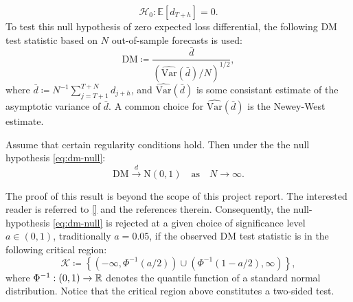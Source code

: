 \begin{equation}\label{eq:dm-null}
    \mathcal{H}_{0}:\mathbb{E}[d_{T+h}]=0.
\end{equation}
To test this null hypothesis of zero expected loss differential, the following DM test statistic based on $N$ out-of-sample forecasts is used:
\begin{equation}\label{eq:dm-teststatistic}
    \mathrm{DM}\coloneqq\frac{\bar{d}}{\left(\widehat{\mathrm{Var}}(\bar{d})/N\right)^{1/2}},
\end{equation}
where $\bar{d}\coloneqq N^{-1}\sum_{j=T+1}^{T+N}d_{j+h}$, and $\widehat{\mathrm{Var}}(\bar{d})$ is some consistant estimate of the asymptotic variance of $\bar{d}$. A common choice for $\widehat{\mathrm{Var}}(\bar{d})$ is the Newey-West estimate.

\begin{prop}
Assume that certain regularity conditions hold. Then under the the null hypothesis \eqref{eq:dm-null}:
\begin{equation*}
    \mathrm{DM}\overset{d}{\to}\mathrm{N}(0,1)\quad\mathrm{as}\quad N\to\infty.
\end{equation*}
\end{prop}
The proof of this result is beyond the scope of this project report. The interested reader is referred to \ref{} and the references therein. %
Consequently, the null-hypothesis \eqref{eq:dm-null} is rejected at a given choice of significance level $a\in(0,1)$, traditionally $a=0.05$, if the observed DM test statistic is in the following critical region:
\begin{equation*}
    \mathcal{K}\coloneqq\left\{\left(-\infty,\Phi^{-1}(a/2)\right)\cup\left(\Phi^{-1}(1-a/2),\infty\right)\right\},
\end{equation*}
where $\Phi^{-1}:(0,1)\to\mathbb{R}$ denotes the quantile function of a standard normal distribution. Notice that the critical region above constitutes a two-sided test.













